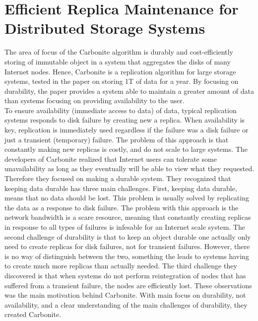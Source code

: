 \documentclass{article}
\begin{document}
\section*{Efficient Replica Maintenance for Distributed Storage Systems}

The area of focus of the Carbonite algorithm is durably and cost-efficiently storing of immutable object in a system that aggregates the disks of many Internet nodes. Hence, Carbonite is a replication algorithm for large storage systems, tested in the paper on storing 1T of data for a year. By focusing on durability, the paper provides a system able to maintain a greater amount of data than systems focusing on providing availability to the user. \\

\noindent To ensure availability (immediate access to data) of data, typical replication systems responds to disk failure by creating new a replica. When availability is key, replication is immediately used regardless if the failure was a disk failure or just a transient (temporary) failure. The problem of this approach is that constantly making new replicas is costly, and do not scale to large systems. The developers of Carbonite realized that Internet users can tolerate some unavailability as long as they eventually will be able to view what they requested. Therefore they focused on making a durable system. They recognized that keeping data durable has three main challenges. First, keeping data durable, means that no data should be lost. This problem is usually solved by replicating the data as a response to disk failure. The problem with this approach is the network bandwidth is a scare resource, meaning that constantly creating replicas in response to all types of failures is infesable for an Internet scale system. The second challenge of durability is that to keep an object durable one actually only need to create replicas for disk failures, not for transient failures. However, there is no way of distinguish between the two, something the leads to systems having to create much more replicas than actually needed. The third challenge they discovered is that when systems do not perform reintegration of nodes that has suffered from a transient failure, the nodes are efficiently lost. These observations was the main motivation behind Carbonite. With main focus on durability, not availability, and a clear understanding of the main challenges of durability, they created Carbonite.\\
\end{document}
